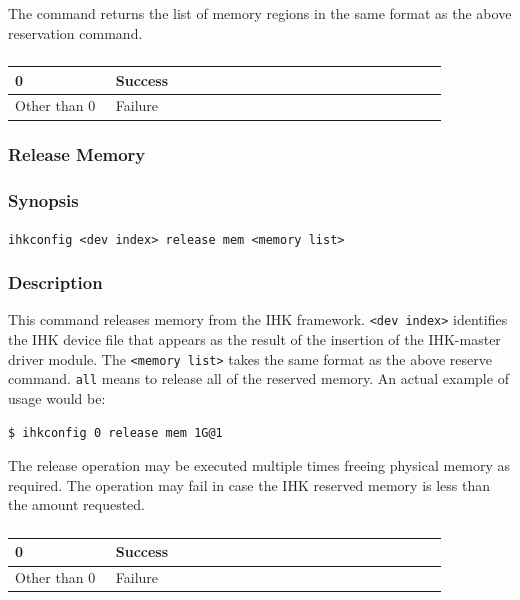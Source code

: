 \documentclass[twoside,11pt,fleqn]{book}
\begin{document}
The command returns the list of memory regions in the same format as the above
reservation command.

\subsubsection*{}
\begin{table}[!h]
\footnotesize
\begin{tabular}{|p{0.20\linewidth}|p{0.66\linewidth}|} \hline
0&Success\\ \hline
Other than 0&Failure\\ \hline
\end{tabular}
\vspace{-0em}
\end{table}
\FloatBarrier

\subsubsection{Release Memory}
\subsubsection*{Synopsis}{\quad}\texttt{ihkconfig <dev index> release mem <memory list>}
\subsubsection*{Description}{\quad}
This command releases memory from the IHK framework.
\texttt{<dev index>} identifies
the IHK device file that appears as the result of the insertion of the
IHK-master driver module.
The \texttt{<memory list>} takes the same format as the above reserve command. \texttt{all} means to release all of the reserved memory.
An actual example of usage would be:

\begin{verbatim}
$ ihkconfig 0 release mem 1G@1
\end{verbatim}

The release operation may be executed multiple times freeing
physical memory as required.
The operation may fail in case the IHK reserved
memory is less than the amount requested.

\subsubsection*{}
\begin{table}[!h]
\footnotesize
\begin{tabular}{|p{0.20\linewidth}|p{0.66\linewidth}|} \hline
0&Success\\ \hline
Other than 0&Failure\\ \hline
\end{tabular}
\vspace{-0em}
\end{table}
\FloatBarrier
\end{document}
